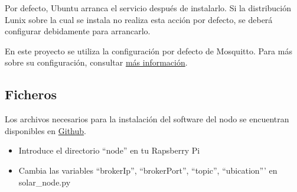 Por defecto, Ubuntu arranca el servicio después de instalarlo. Si la distribución Lunix sobre la cual se instala no realiza esta acción por defecto, se deberá configurar debidamente para arrancarlo.

En este proyecto se utiliza la configuración por defecto de Mosquitto. Para más sobre su configuración, consultar \href{https://www.digitalocean.com/community/tutorials/how-to-install-and-secure-the-mosquitto-mqtt-messaging-broker-on-ubuntu-16-04}{más información}.

\subsection{Ficheros}
\label{makereference7.1.3}
Los archivos necesarios para la instalación del software del nodo se encuentran disponibles en \href{https://github.com/MrSlide22/TFG/node}{Github}.

\begin{itemize}
	\item Introduce el directorio ``node'' en tu Rapsberry Pi
	\item Cambia las variables ``brokerIp'', ``brokerPort'', ``topic'', ``ubication''' en solar\_node.py
\end{itemize}

